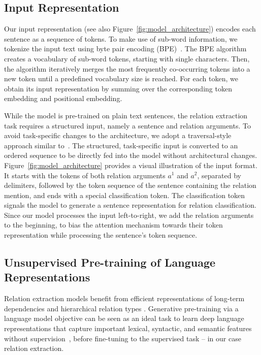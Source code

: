 \documentclass[akbc,twoside,11pt]{article}
\begin{document}
\subsection{Input Representation}
\label{sec:input_representation}
Our input representation (see also Figure~\ref{fig:model_architecture}) encodes each sentence as a sequence of tokens. To make use of sub-word information, we tokenize the input text using byte pair encoding (BPE)~\cite{sennrich_subword_2016}. The BPE algorithm creates a vocabulary of sub-word tokens, starting with single characters. Then, the algorithm iteratively merges the most frequently co-occurring tokens into a new token until a predefined vocabulary size is reached. For each token, we obtain its input representation by summing over the corresponding token embedding and positional embedding.

While the model is pre-trained on plain text sentences, the relation extraction task requires a structured input, namely a sentence and relation arguments.
To avoid task-specific changes to the architecture, we adopt a traversal-style approach similar to~\citet{radford_improvinglu_2018}. The structured, task-specific input is converted to an ordered sequence to be directly fed into the model without architectural changes. Figure~\ref{fig:model_architecture} provides a visual illustration of the input format. It starts with the tokens of both relation arguments $a^1$ and $a^2$, separated by delimiters, followed by the token sequence of the sentence containing the relation mention, and ends with a special classification token. The classification token signals the model to generate a sentence representation for relation classification. Since our model processes the input left-to-right, we add the relation arguments to the beginning, to bias the attention mechanism towards their token representation while processing the sentence's token sequence.

\subsection{Unsupervised Pre-training of Language Representations}
\label{sec:unsuperv_pretraining}
Relation extraction models benefit from efficient representations of long-term dependencies \cite{zhang_graphco_2018} and hierarchical relation types \cite{re_relation_att}. Generative pre-training via a language model objective can be seen as an ideal task to learn deep language representations that capture important lexical, syntactic, and semantic features without supervision~\cite{linzen_assessingta_2016, radford_improvinglu_2018, ruder_universallm_2018}, before fine-tuning to the supervised task -- in our case relation extraction.
\end{document}
